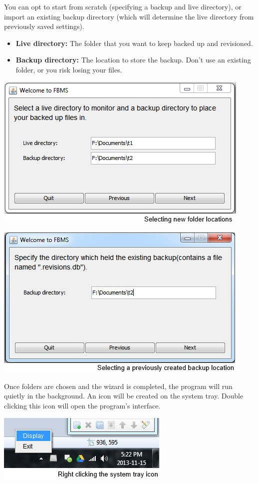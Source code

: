 \documentclass[12pt,a4paper]{article}
\begin{document}
You can opt to start from scratch (specifying a backup and live directory), or import an existing backup directory (which will determine the live directory from previously saved settings).

\begin{itemize}
\item \textbf{Live directory:} The folder that you want to keep backed up and revisioned.
\item \textbf{Backup directory:} The location to store the backup. Don't use an existing folder, or you risk losing your files.
\end{itemize}

\includegraphics{images/2-newBackup.png}

\includegraphics{images/3-oldBackup.png}

Once folders are chosen and the wizard is completed, the program will run quietly in the background. An icon will be created on the system tray. Double clicking this icon will open the program's interface.

\includegraphics{images/4-systemTray.png}
\end{document}
